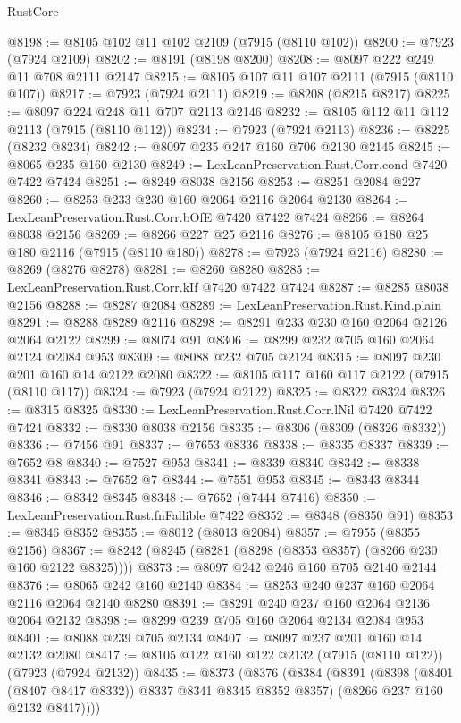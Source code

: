 \begin{lexlean}{RustCore}
\begin{coremodule}
@8198 := @8105 @102 @11 @102 @2109 (@7915 (@8110 @102))
@8200 := @7923 (@7924 @2109)
@8202 := @8191 (@8198 @8200)
@8208 := @8097 @222 @249 @11 @708 @2111 @2147
@8215 := @8105 @107 @11 @107 @2111 (@7915 (@8110 @107))
@8217 := @7923 (@7924 @2111)
@8219 := @8208 (@8215 @8217)
@8225 := @8097 @224 @248 @11 @707 @2113 @2146
@8232 := @8105 @112 @11 @112 @2113 (@7915 (@8110 @112))
@8234 := @7923 (@7924 @2113)
@8236 := @8225 (@8232 @8234)
@8242 := @8097 @235 @247 @160 @706 @2130 @2145
@8245 := @8065 @235 @160 @2130
@8249 := LexLeanPreservation.Rust.Corr.cond @7420 @7422 @7424
@8251 := @8249 @8038 @2156
@8253 := @8251 @2084 @227
@8260 := @8253 @233 @230 @160 @2064 @2116 @2064 @2130
@8264 := LexLeanPreservation.Rust.Corr.bOfE @7420 @7422 @7424
@8266 := @8264 @8038 @2156
@8269 := @8266 @227 @25 @2116
@8276 := @8105 @180 @25 @180 @2116 (@7915 (@8110 @180))
@8278 := @7923 (@7924 @2116)
@8280 := @8269 (@8276 @8278)
@8281 := @8260 @8280
@8285 := LexLeanPreservation.Rust.Corr.kIf @7420 @7422 @7424
@8287 := @8285 @8038 @2156
@8288 := @8287 @2084
@8289 := LexLeanPreservation.Rust.Kind.plain
@8291 := @8288 @8289 @2116
@8298 := @8291 @233 @230 @160 @2064 @2126 @2064 @2122
@8299 := @8074 @91
@8306 := @8299 @232 @705 @160 @2064 @2124 @2084 @953
@8309 := @8088 @232 @705 @2124
@8315 := @8097 @230 @201 @160 @14 @2122 @2080
@8322 := @8105 @117 @160 @117 @2122 (@7915 (@8110 @117))
@8324 := @7923 (@7924 @2122)
@8325 := @8322 @8324
@8326 := @8315 @8325
@8330 := LexLeanPreservation.Rust.Corr.lNil @7420 @7422 @7424
@8332 := @8330 @8038 @2156
@8335 := @8306 (@8309 (@8326 @8332))
@8336 := @7456 @91
@8337 := @7653 @8336
@8338 := @8335 @8337
@8339 := @7652 @8
@8340 := @7527 @953
@8341 := @8339 @8340
@8342 := @8338 @8341
@8343 := @7652 @7
@8344 := @7551 @953
@8345 := @8343 @8344
@8346 := @8342 @8345
@8348 := @7652 (@7444 @7416)
@8350 := LexLeanPreservation.Rust.fnFallible @7422
@8352 := @8348 (@8350 @91)
@8353 := @8346 @8352
@8355 := @8012 (@8013 @2084)
@8357 := @7955 (@8355 @2156)
@8367 := @8242 (@8245 (@8281 (@8298 (@8353 @8357) (@8266 @230 @160 @2122 @8325))))
@8373 := @8097 @242 @246 @160 @705 @2140 @2144
@8376 := @8065 @242 @160 @2140
@8384 := @8253 @240 @237 @160 @2064 @2116 @2064 @2140 @8280
@8391 := @8291 @240 @237 @160 @2064 @2136 @2064 @2132
@8398 := @8299 @239 @705 @160 @2064 @2134 @2084 @953
@8401 := @8088 @239 @705 @2134
@8407 := @8097 @237 @201 @160 @14 @2132 @2080
@8417 := @8105 @122 @160 @122 @2132 (@7915 (@8110 @122)) (@7923 (@7924 @2132))
@8435 := @8373
    (@8376
      (@8384
        (@8391
          (@8398 (@8401 (@8407 @8417 @8332)) @8337 @8341 @8345 @8352 @8357)
          (@8266 @237 @160 @2132 @8417))))

\end{coremodule}
\end{lexlean}
